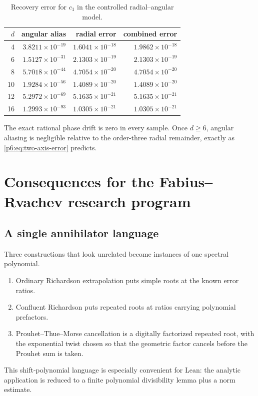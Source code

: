 \documentclass[11pt]{article}
\numberwithin{equation}{section}
\theoremstyle{definition}
\theoremstyle{remark}
\begin{document}
\begin{table}[H]
\centering
\caption{Recovery error for $c_1$ in the controlled radial--angular model.}
\label{p6:tab:tomography}
\begin{tabular}{rrrr}
\toprule
$d$ & angular alias & radial error & combined error\\
\midrule
4 & $3.8211\times10^{-19}$ & $1.6041\times10^{-18}$ & $1.9862\times10^{-18}$\\
6 & $1.5127\times10^{-31}$ & $2.1303\times10^{-19}$ & $2.1303\times10^{-19}$\\
8 & $5.7018\times10^{-44}$ & $4.7054\times10^{-20}$ & $4.7054\times10^{-20}$\\
10 & $1.9284\times10^{-56}$ & $1.4089\times10^{-20}$ & $1.4089\times10^{-20}$\\
12 & $5.2972\times10^{-69}$ & $5.1635\times10^{-21}$ & $5.1635\times10^{-21}$\\
16 & $1.2993\times10^{-93}$ & $1.0305\times10^{-21}$ & $1.0305\times10^{-21}$\\
\bottomrule
\end{tabular}
\end{table}

The exact rational phase drift is zero in every sample.  Once $d\ge6$, angular aliasing is
negligible relative to the order-three radial remainder, exactly as
\eqref{p6:eq:two-axis-error} predicts.

\section{Consequences for the Fabius--Rvachev research program}
\label{p6:sec:consequences}

\subsection{A single annihilator language}

Three constructions that look unrelated become instances of one spectral polynomial.
\begin{enumerate}
\item Ordinary Richardson extrapolation puts simple roots at the known error ratios.
\item Confluent Richardson puts repeated roots at ratios carrying polynomial prefactors.
\item Prouhet--Thue--Morse cancellation is a digitally factorized repeated root, with the
      exponential twist chosen so that the geometric factor cancels before the Prouhet sum
      is taken.
\end{enumerate}
This shift-polynomial language is especially convenient for Lean: the analytic application
is reduced to a finite polynomial divisibility lemma plus a norm estimate.
\end{document}

